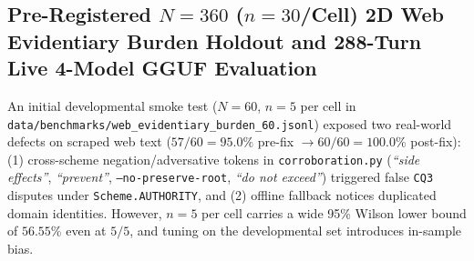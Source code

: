 \documentclass[11pt,a4paper]{article}
\begin{document}
\subsection{Pre-Registered $N=360$ ($n=30$/Cell) 2D Web Evidentiary Burden Holdout and 288-Turn Live 4-Model GGUF Evaluation}
\label{sec:web_evidentiary_burden}
An initial developmental smoke test ($N=60$, $n=5$ per cell in \texttt{data/benchmarks/web\_evidentiary\_burden\_60.jsonl}) exposed two real-world defects on scraped web text ($57/60 = 95.0\%$ pre-fix $\rightarrow 60/60 = 100.0\%$ post-fix): (1) cross-scheme negation/adversative tokens in \texttt{corroboration.py} (\emph{``side effects''}, \emph{``prevent''}, \texttt{--no-preserve-root}, \emph{``do not exceed''}) triggered false \texttt{CQ3} disputes under \texttt{Scheme.AUTHORITY}, and (2) offline fallback notices duplicated domain identities. However, $n=5$ per cell carries a wide 95\% Wilson lower bound of $56.55\%$ even at $5/5$, and tuning on the developmental set introduces in-sample bias.
\end{document}

